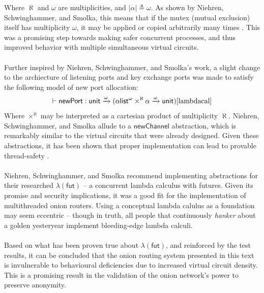 \documentclass[10pt]{report}
\begin{document}
Where $\aleph$ and $\omega$ are multiplicities, and $|\alpha|\triangleq \omega$. As shown by
Niehren, Schwinghammer, and Smolka, this means that if
the mutex (mutual exclusion) itself has multiplicity $\omega$, it may be applied or copied
arbitrarily many times \cite{lambdacal}. This was a promising step towards making safer concurrent
processes, and thus improved behavior with multiple simultaneous virtual circuits.\\\\
Further inspired by Niehren, Schwinghammer, and Smolka's work, a slight change to the archiecture of
listening ports and key exchange ports was made to satisfy the following model of new port
allocation:
\begin{equation}
	\vdash\mathsf{newPort}:\mathsf{unit}\xrightarrow{\omega}(\alpha\mathsf{list}^{\omega}\times^{\aleph}\alpha\xrightarrow{\omega}\mathsf{unit})\cite{lambdacal}
\end{equation}
Where $\times^{\aleph}$ may be interpreted as a cartesian product of multiplicity $\aleph$. Niehren,
Schwinghammer, and Smolka allude to a $\mathsf{newChannel}$ abstraction, which is remarkably similar
to the virtual circuits that were already designed. Given these abstractions, it has been shown that
proper implementation can lead to provable thread-safety \cite{lambdacal}.\\\\
Niehren, Schwinghammer, and Smolka recommend implementing abstractions for their researched
$\lambda(\mathsf{fut})$ -- a concurrent lambda calculus with futures. Given its promise and security
implications, it was a good fit for the implementation of multithreaded onion routers. Using a
conceptual lambda calulus as a foundation may seem eccentric -- though in truth, all people that
continuously \textit{hanker} about a golden yesteryear implement bleeding-edge lambda calculi.\\\\
Based on what has been proven true about $\lambda(\mathsf{fut})$, and reinforced by the test
results, it can be concluded that the onion routing system presented in this text is invulnerable to
behavioural deficiencies due to increased virtual circuit density. This is a promising result in the
validation of the onion network's power to preserve anonymity.
\end{document}
